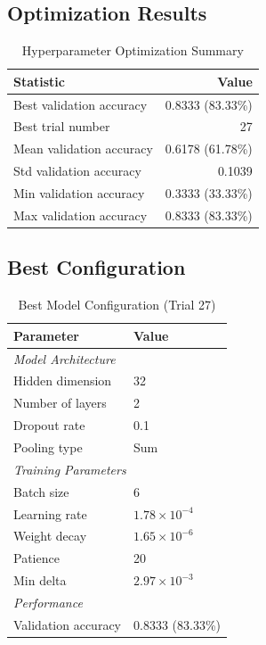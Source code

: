\subsection{Optimization Results}

\begin{table}[H]
\centering
\caption{Hyperparameter Optimization Summary}
\label{tab:hyperopt_summary}
\begin{tabular}{lr}
\toprule
\textbf{Statistic} & \textbf{Value} \\
\midrule
Best validation accuracy & 0.8333 (83.33\%) \\
Best trial number & 27 \\
Mean validation accuracy & 0.6178 (61.78\%) \\
Std validation accuracy & 0.1039 \\
Min validation accuracy & 0.3333 (33.33\%) \\
Max validation accuracy & 0.8333 (83.33\%) \\
\bottomrule
\end{tabular}
\end{table}

\subsection{Best Configuration}

\begin{table}[H]
\centering
\caption{Best Model Configuration (Trial 27)}
\label{tab:best_config}
\begin{tabular}{ll}
\toprule
\textbf{Parameter} & \textbf{Value} \\
\midrule
\multicolumn{2}{l}{\textit{Model Architecture}} \\
Hidden dimension & 32 \\
Number of layers & 2 \\
Dropout rate & 0.1 \\
Pooling type & Sum \\
\midrule
\multicolumn{2}{l}{\textit{Training Parameters}} \\
Batch size & 6 \\
Learning rate & $1.78 \times 10^{-4}$ \\
Weight decay & $1.65 \times 10^{-6}$ \\
Patience & 20 \\
Min delta & $2.97 \times 10^{-3}$ \\
\midrule
\multicolumn{2}{l}{\textit{Performance}} \\
Validation accuracy & 0.8333 (83.33\%) \\
\bottomrule
\end{tabular}
\end{table}

